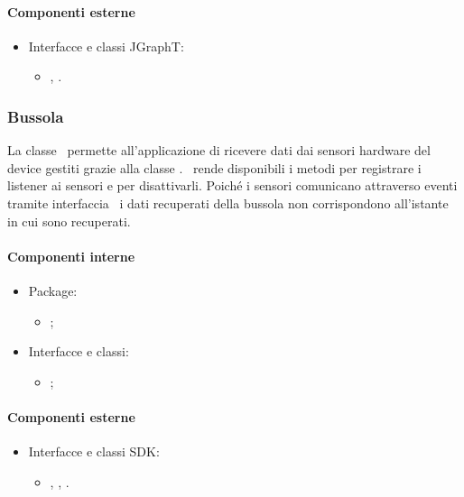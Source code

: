 \documentclass[../Funzionalita.tex]{subfiles}
\begin{document}
			
			\paragraph*{Componenti esterne}
			
			\begin{itemize}
				\item Interfacce e classi JGraphT:
				\begin{itemize}
					\item[] \DijkstraShorterPath, \SimpleDirectedWeightedGraph.
				\end{itemize}
			\end{itemize}
		
		
		\subsubsection{Bussola}
			La classe \Compass\ permette all'applicazione di ricevere dati dai sensori hardware del device gestiti grazie alla classe \Sensor. \Compass\ rende disponibili i metodi per registrare i listener ai sensori e per disattivarli. Poiché i sensori comunicano attraverso eventi tramite interfaccia \SensorEventListener\ i dati recuperati della bussola non corrispondono all'istante in cui sono recuperati.
		
			\paragraph*{Componenti interne}
			\begin{itemize}
			
				\item Package:
				\begin{itemize}
					\item[] \compass;
				\end{itemize}
				
				\item Interfacce e classi:
				\begin{itemize}
					\item[] \Compass;
				\end{itemize}
				
			\end{itemize}
			
			
			\paragraph*{Componenti esterne}
			\begin{itemize}
			
				\item Interfacce e classi SDK:
				\begin{itemize}
					\item[] \SensorManager, \Sensor, \SensorEventListener.
				\end{itemize}
				
			\end{itemize}
						
\end{document}
